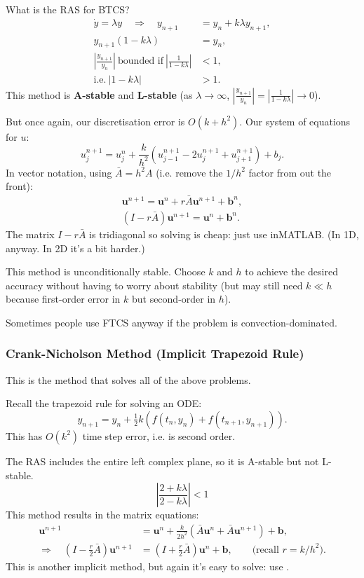 \documentclass[12pt, a4paper]{article}
\theoremstyle{definition}
\theoremstyle{remark}
\numberwithin{equation}{section}
\begin{document}
What is the RAS for BTCS?
\begin{align*}
\dot{y} = \lambda y \quad \Longrightarrow \quad y_{n+1} &= y_n + k\lambda y_{n+1}, \\
y_{n+1}(1-k\lambda) &= y_n,\\
\left|\tfrac{y_{n+1}}{y_n}\right|\ \text{bounded if}\ \left|\tfrac{1}{1-k\lambda}\right| &< 1, \\
\text{i.e.}\ |1 - k\lambda| &> 1.
\end{align*}
This method is \textbf{A-stable} and \textbf{L-stable} (as $\lambda\rightarrow\infty$,
$\left| \tfrac{y_{n+1}}{y_n} \right| = \left|\tfrac{1}{1-k\lambda}\right| \rightarrow 0$).

But once again, our discretisation error is $O(k+h^2)$. Our system of equations
for $u$:
$$ u_j^{n+1} = u_j^n + \frac{k}{h^2}\left( u_{j-1}^{n+1} - 2u_j^{n+1} + u_{j+1}^{n+1} \right) + b_j. $$
In vector notation, using $\bar{A} = h^2 A$ (i.e. remove the $1/h^2$ factor from
out the front):
\begin{align*}
\mathbf{u}^{n+1} = \mathbf{u}^n + r \bar{A} \mathbf{u}^{n+1} + \mathbf{b}^n, \\
(I - r\bar{A})\mathbf{u}^{n+1} = \mathbf{u}^n + \mathbf{b}^n.
\end{align*}
The matrix $I-r\bar{A}$ is tridiagonal so solving is cheap: just use \mcode{\\} inMATLAB. (In 1D, anyway. In 2D it's a bit harder.)

This method is unconditionally stable. Choose $k$ and $h$ to achieve the desired
accuracy without having to worry about stability (but may still need $k \ll h$
because first-order error in $k$ but second-order in $h$).

Sometimes people use FTCS anyway if the problem is convection-dominated.

\newpage
\subsubsection{Crank-Nicholson Method (Implicit Trapezoid Rule)}

This is the method that solves all of the above problems. 

Recall the trapezoid rule for solving an ODE:
$$ y_{n+1} = y_n + \tfrac{1}{2} k(f(t_n, y_n) + f(t_{n+1}, y_{n+1})).$$
This has $O(k^2)$ time step error, i.e. is second order.

The RAS includes the entire left complex plane, so it is A-stable but not L-stable.
$$\left| \frac{2+k\lambda}{2-k\lambda} \right| < 1 $$
This method results in the matrix equations:
\begin{align*}
\mathbf{u}^{n+1} &= \mathbf{u}^n + \tfrac{k}{2h^2}\left(\bar{A}\mathbf{u}^n + \bar{A}\mathbf{u}^{n+1} \right) + \mathbf{b}, \\
\Longrightarrow \quad \left(I - \tfrac{r}{2} \bar{A}\right) \mathbf{u}^{n+1} &= \left(I + \tfrac{r}{2}\bar{A}\right)\mathbf{u}^n + \mathbf{b},
\qquad \text{(recall $r=k/h^2$).}
\end{align*}
This is another implicit method, but again it's easy to solve: use \mcode{\\}.
\end{document}
